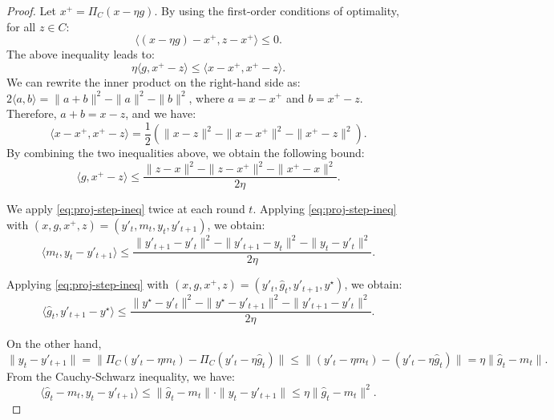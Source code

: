 \documentclass[journal,onecolumn]{IEEEtran}
\theoremstyle{plain}
\theoremstyle{definition}
\theoremstyle{remark}
\begin{document}
{\begin{proof}
    Let $x^{+}= \Pi_{C}(x-\eta g)$. By using the first-order conditions of optimality, for all $z\in C$:
    \begin{equation*}
        \langle (x - \eta g) - x^{+}, z - x^{+}\rangle \le 0.
    \end{equation*}
    The above inequality leads to:
    \begin{equation*}
        \eta \langle g, x^{+}- z \rangle \le \langle x - x^{+}, x^{+}- z \rangle.
    \end{equation*}
    We can rewrite the inner product on the right-hand side as: 
     $2\langle a, b\rangle = \|a+b\|^{2}- \|a\|^{2}- \|b\|^{2}$, where $a = x - x^{+}$ and $b = x^{+}- z$. Therefore, $a+b = x-z$, and we have:
    \begin{equation*}
        \langle x - x^{+}, x^{+}- z \rangle = \frac{1}{2}\left( \|x - z\|^{2}- \|
        x - x^{+}\|^{2}- \|x^{+}- z\|^{2}\right).
    \end{equation*}
    By combining the two inequalities above, we obtain the following bound:
    \begin{equation}
        \langle g, x^{+}-z\rangle \le \frac{\|z-x\|^{2}- \|z-x^{+}\|^{2}- \|x^{+}-x\|^{2}}{2\eta}. \label{eq:proj-step-ineq}
    \end{equation}

    We apply \eqref{eq:proj-step-ineq} twice at each round $t$. Applying \eqref{eq:proj-step-ineq}
    with $(x, g, x^{+}, z) = (y'_{t}, m_{t}, y_{t}, y'_{t+1})$, we obtain:
    \begin{equation}
        \langle m_{t}, y_{t}-y'_{t+1}\rangle \le \frac{\|y'_{t+1}-y'_{t}\|^{2}-
        \|y'_{t+1}-y_{t}\|^{2}- \|y_{t}-y'_{t}\|^{2}}{2\eta}. \label{eq:step1}
    \end{equation}

    Applying \eqref{eq:proj-step-ineq} with
    $(x, g, x^{+}, z) = (y'_{t}, \hat g_{t}, y'_{t+1}, y^{\star})$, we obtain:
    \begin{equation}
        \langle \hat g_{t}, y'_{t+1}-y^{\star}\rangle \le \frac{\|y^{\star}-y'_{t}\|^{2}-
        \|y^{\star}-y'_{t+1}\|^{2}- \|y'_{t+1}-y'_{t}\|^{2}}{2\eta}. \label{eq:step2}
    \end{equation}

    On the other hand, 
    \begin{equation*}
        \|y_{t}-y'_{t+1}\| =\|\Pi_{C}(y'_{t}-\eta m_{t}) - \Pi_{C}(y'_{t}-\eta \hat
        g_{t})\| \le \|(y'_{t}-\eta m_{t}) - (y'_{t}-\eta \hat g_{t})\|= \eta\|\hat
        g_{t}-m_{t}\|.
    \end{equation*}
    From the Cauchy-Schwarz inequality, we have:
    \begin{equation}
        \langle \hat g_{t}-m_{t}, y_{t}-y'_{t+1}\rangle \le \|\hat g_{t}-m_{t}\|
        \cdot \|y_{t}-y'_{t+1}\| \le \eta\|\hat g_{t}-m_{t}\|^{2}. \label{eq:cross}
    \end{equation}


\end{proof}}
\end{document}
